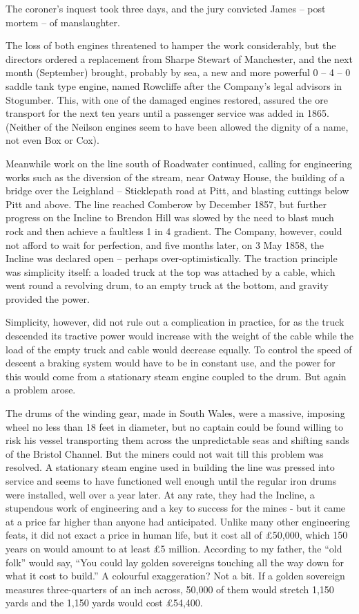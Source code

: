 \documentclass[11pt]{book}
\begin{document}
The coroner’s inquest took three days, and the jury convicted James – post mortem – of manslaughter.

The loss of both engines threatened to hamper the work considerably,  but the directors ordered a replacement from Sharpe Stewart of Manchester, and the next month (September) brought, probably by sea, a new and more powerful 0 – 4 – 0  saddle tank type engine, named Rowcliffe  after the Company’s legal advisors in Stogumber.  This, with one of the damaged engines restored, assured the ore transport for the next ten years until a passenger service was added in 1865. (Neither of the Neilson engines seem to have been allowed the dignity of a name, not even Box or Cox). 

Meanwhile work on the line south of Roadwater continued, calling for engineering works such as the diversion of the stream, near Oatway House, the building of a bridge over the Leighland – Sticklepath road at Pitt, and blasting cuttings below Pitt and above. The line reached Comberow by December 1857, but further progress on the Incline to Brendon Hill was slowed by the need to blast much rock and then  achieve a faultless 1 in 4 gradient. The Company, however, could not afford to wait for perfection, and five months later, on 3 May 1858, the Incline was declared open – perhaps over-optimistically. The traction principle was simplicity itself: a loaded truck at the top was attached by a cable, which went round a revolving drum, to an empty truck at the bottom, and gravity provided the power.

Simplicity, however, did not rule out a complication in practice, for as the truck descended its tractive power would increase with the weight of the cable while the load of the empty truck and cable would decrease equally. To control the speed of descent a braking system would have to be in constant use, and the power for this would come from a stationary steam engine coupled to the drum. But again a problem arose.

The drums of the winding gear, made in South Wales, were a massive, imposing wheel no less than 18 feet in diameter, but no captain could be found willing to risk his vessel transporting them across the unpredictable seas and shifting sands of the Bristol Channel. But the miners could not wait till this problem was resolved. A stationary steam engine used in building the line was pressed into service and seems to have functioned well enough until the regular iron drums were installed, well over a year later. At any rate, they had the Incline, a stupendous work of engineering and a key to success for the mines - but it came at a price far higher than anyone had anticipated. Unlike many other engineering feats, it did not exact a price in human life, but it cost all of £50,000, which 150 years on would amount to at least £5 million.  According to my father, the “old folk” would say, “You could lay golden sovereigns touching all the way down for what it cost to build.” A colourful exaggeration? Not a bit. If a golden sovereign measures three-quarters of an inch across, 50,000 of them would stretch 1,150 yards and the 1,150 yards would cost £54,400.
\end{document}
